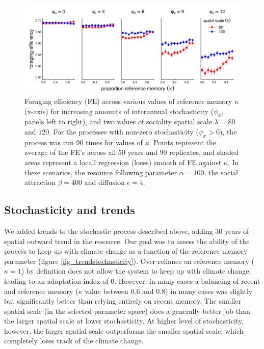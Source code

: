 \documentclass[utf8]{frontiersSCNS} %
\begin{document}
\begin{figure}
	\includegraphics[width=\textwidth]{figures/stochasticity.png}
	
	\caption{\label{fig_stochasticity} Foraging efficiency (FE) across various values of reference memory $\kappa$ (x-axis) for increasing amounts of interannual stochasticity ($\psi_x$, panels left to right), and two values of sociality spatial scale $\lambda = 80$ and $120$. For the processes with non-zero stochasticity ($\psi_x > 0$), the process was run 90 times for values of $\kappa$. Points represent the average of the FE's across all 50 years and 90 replicates, and shaded areas represent a locall regression (loess) smooth of FE against $\kappa$. In these scenarios, the resource following parameter $\alpha = 100$, the social attraction $\beta = 400$ and diffusion $\epsilon = 4$.} 
	
\end{figure}

\subsection{Stochasticity and trends}

We added trends to the stochastic process described above, adding 30 years of spatial outward trend in the resource. Our goal was to assess the ability of the process to keep up with climate change as a function of the reference memory parameter (figure \ref{fig_trendstochasticity}). Over-reliance on reference memory ($\kappa = 1$) by definition does not allow the system to keep up with climate change, leading to an adaptation index of 0. However, in many cases a balancing of recent and reference memory ($\kappa$ value between 0.6 and 0.8) in many cases was slightly but significantly better than relying entirely on recent memory. The smaller spatial scale (in the selected parameter space) does a generally better job than the larger spatial scale at lower stochasticity. At higher level of stochasticity, however, the larger spatial scale outperforms the smaller spatial scale, which completely loses track of the climate change.
\end{document}
